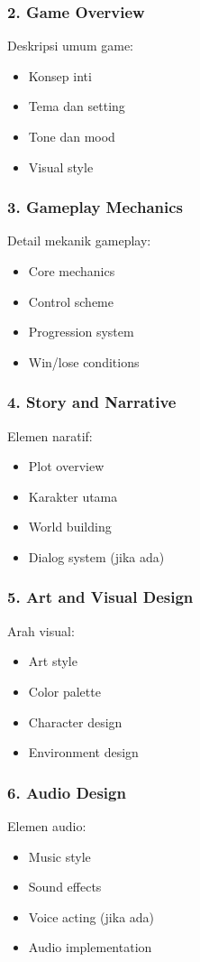 \subsubsection{2. Game Overview}
Deskripsi umum game:
\begin{itemize}
\item Konsep inti
\item Tema dan setting
\item Tone dan mood
\item Visual style
\end{itemize}

\subsubsection{3. Gameplay Mechanics}
Detail mekanik gameplay:
\begin{itemize}
\item Core mechanics
\item Control scheme
\item Progression system
\item Win/lose conditions
\end{itemize}

\subsubsection{4. Story and Narrative}
Elemen naratif:
\begin{itemize}
\item Plot overview
\item Karakter utama
\item World building
\item Dialog system (jika ada)
\end{itemize}

\subsubsection{5. Art and Visual Design}
Arah visual:
\begin{itemize}
\item Art style
\item Color palette
\item Character design
\item Environment design
\end{itemize}

\subsubsection{6. Audio Design}
Elemen audio:
\begin{itemize}
\item Music style
\item Sound effects
\item Voice acting (jika ada)
\item Audio implementation
\end{itemize}

